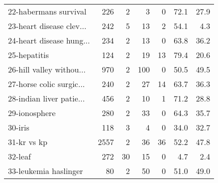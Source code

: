 \begin{table}[h]
\begin{center}
\begin{tabular}{l|r r r r r r}
22-habermans survival & 226 & 2 & 3 & 0 &  72.1 &  27.9\\
23-heart disease clev... & 242 & 5 & 13 & 2 &  54.1 &   4.3\\
24-heart disease hung... & 234 & 2 & 13 & 0 &  63.8 &  36.2\\\hline
25-hepatitis & 124 & 2 & 19 & 13 &  79.4 &  20.6\\
26-hill valley withou... & 970 & 2 & 100 & 0 &  50.5 &  49.5\\
27-horse colic surgic... & 240 & 2 & 27 & 14 &  63.7 &  36.3\\\hline
28-indian liver patie... & 456 & 2 & 10 & 1 &  71.2 &  28.8\\
29-ionosphere & 280 & 2 & 33 & 0 &  64.3 &  35.7\\
30-iris & 118 & 3 & 4 & 0 &  34.0 &  32.7\\\hline
31-kr vs kp & 2557 & 2 & 36 & 36 &  52.2 &  47.8\\
32-leaf & 272 & 30 & 15 & 0 &   4.7 &   2.4\\
33-leukemia haslinger & 80 & 2 & 50 & 0 &  51.0 &  49.0\\\hline\end{tabular}
\label{tab:datasetsa}
\end{center}
\end{table}

